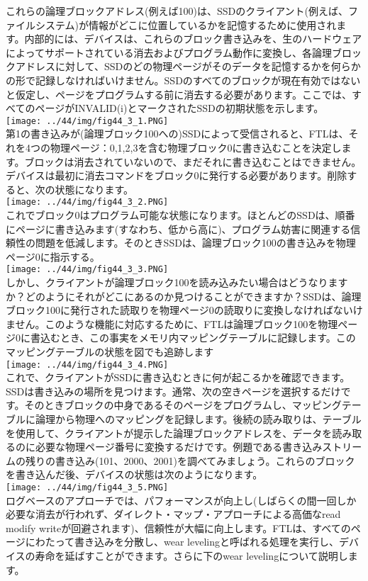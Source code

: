 これらの論理ブロックアドレス(例えば100)は、SSDのクライアント(例えば、ファイルシステム)が情報がどこに位置しているかを記憶するために使用されます。内部的には、デバイスは、これらのブロック書き込みを、生のハードウェアによってサポートされている消去およびプログラム動作に変換し、各論理ブロックアドレスに対して、SSDのどの物理ページがそのデータを記憶するかを何らかの形で記録しなければいけません。SSDのすべてのブロックが現在有効ではないと仮定し、ページをプログラムする前に消去する必要があります。ここでは、すべてのページがINVALID(i)とマークされたSSDの初期状態を示します。\\
\texttt{[image: ../44/img/fig44\_3\_1.PNG]}\\
第1の書き込みが(論理ブロック100への)SSDによって受信されると、FTLは、それを4つの物理ページ：0,1,2,3を含む物理ブロック0に書き込むことを決定します。ブロックは消去されていないので、まだそれに書き込むことはできません。デバイスは最初に消去コマンドをブロック0に発行する必要があります。削除すると、次の状態になります。\\
\texttt{[image: ../44/img/fig44\_3\_2.PNG]}\\
これでブロック0はプログラム可能な状態になります。ほとんどのSSDは、順番にページに書き込みます(すなわち、低から高に)、プログラム妨害に関連する信頼性の問題を低減します。そのときSSDは、論理ブロック100の書き込みを物理ページ0に指示する。\\
\texttt{[image: ../44/img/fig44\_3\_3.PNG]}\\
しかし、クライアントが論理ブロック100を読み込みたい場合はどうなりますか？どのようにそれがどこにあるのか見つけることができますか？SSDは、論理ブロック100に発行された読取りを物理ページ0の読取りに変換しなければないけません。このような機能に対応するために、FTLは論理ブロック100を物理ページ0に書込むとき、この事実をメモリ内マッピングテーブルに記録します。このマッピングテーブルの状態を図でも追跡します\\
\texttt{[image: ../44/img/fig44\_3\_4.PNG]}\\
これで、クライアントがSSDに書き込むときに何が起こるかを確認できます。SSDは書き込みの場所を見つけます。通常、次の空きページを選択するだけです。そのときブロックの中身であるそのページをプログラムし、マッピングテーブルに論理から物理へのマッピングを記録します。後続の読み取りは、テーブルを使用して、クライアントが提示した論理ブロックアドレスを、データを読み取るのに必要な物理ページ番号に変換するだけです。例題である書き込みストリームの残りの書き込み(101、2000、2001)を調べてみましょう。これらのブロックを書き込んだ後、デバイスの状態は次のようになります。\\
\texttt{[image: ../44/img/fig44\_3\_5.PNG]}\\
ログベースのアプローチでは、パフォーマンスが向上し(しばらくの間一回しか必要な消去が行われず、ダイレクト・マップ・アプローチによる高価なread
modify
writeが回避されます)、信頼性が大幅に向上します。FTLは、すべてのページにわたって書き込みを分散し、wear
levelingと呼ばれる処理を実行し、デバイスの寿命を延ばすことができます。さらに下のwear
levelingについて説明します。


